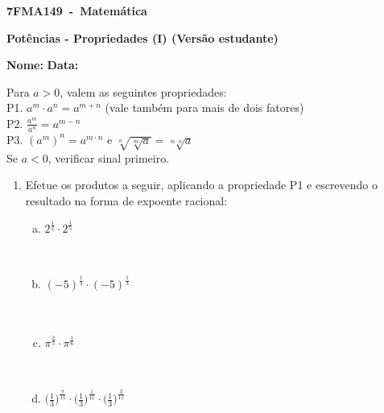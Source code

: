 \documentclass[a4paper,14pt]{article}
\begin{document}
	
	\noindent\textbf{7FMA149~-~Matemática} 
	
	\begin{center}
		\textbf{Potências - Propriedades (I) (Versão estudante)}
	\end{center}
	
	
	\noindent\textbf{Nome:} \underline{\hspace{10cm}}
    \noindent\textbf{Data:} \underline{\hspace{4cm}}
	
	
	\begin{multicols}{2}
		Para $a > 0$, valem as seguintes propriedades: \\
		P1. $a^m \cdot a^n = a^{m + n}$ (vale também para mais de dois fatores) \\
		P2. $\frac{a^m}{a^n} = a^{m - n}$ \\
		P3. $(a^m)^n = a^{m \cdot n}$ e $\sqrt[n]{\sqrt[m]{a}} = \sqrt[m \cdot n]{a}$ \\
		Se $a < 0$, verificar sinal primeiro.
	\begin{enumerate}
        \item Efetue os produtos a seguir, aplicando a propriedade P1 e escrevendo o resultado na forma de expoente racional:
        \begin{enumerate}[a)]
        	\item $2^\frac{1}{2} \cdot 2^\frac{1}{5}$ \\\\\\
        	\item $(-5)^\frac{1}{4} \cdot (-5)^\frac{1}{3}$ \\\\\\
        	\item $\pi^\frac{2}{5} \cdot \pi^\frac{1}{6}$ \\\\\\
        	\item $\bigg(\frac{1}{3}\bigg)^{\frac{7}{11}} \cdot \bigg(\frac{1}{3}\bigg)^{\frac{1}{11}} \cdot  \bigg(\frac{1}{3}\bigg)^{\frac{3}{11}}$\\\\\\\\\\

\end{enumerate}
\end{enumerate}
\end{multicols}
\end{document}
